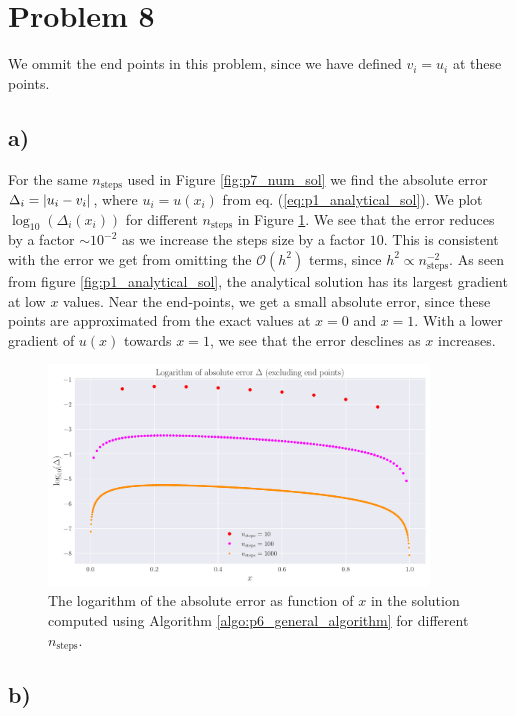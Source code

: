 \documentclass[english,notitlepage,nofootinbib]{revtex4-1}  %
\newcommand{\Fig}[1]{Figure \ref{fig:#1}}
\newcommand{\Eq}[1]{eq. (\ref{eq:#1})}
\newcommand{\Algo}[1]{Algorithm \ref{algo:#1}}
\begin{document}
\section*{Problem 8}

We ommit the end points in this problem, since we have defined $v_i=u_i$ at these points.

\subsection*{a)}

For the same $n_\text{steps}$ used in \Fig{p7_num_sol} we find the absolute error $\Delta_i = \abs{u_i-v_i}$, where $u_i=u(x_i)$ from \Eq{p1_analytical_sol}. We plot $\log_{10}(\Delta_i(x_i))$ for different $n_\text{steps}$ in \Fig{p8_abs_err}. We see that the error reduces by a factor $\sim 10^{-2}$ as we increase the steps size by a factor $10$. This is consistent with the error we get from omitting the $\mathcal{O}(h^2)$ terms, since $h^2 \propto n_\mathrm{steps}^{-2}$. As seen from figure \ref{fig:p1_analytical_sol}, the analytical solution has its largest gradient at low $x$ values. Near the end-points, we get a small absolute error, since these points are approximated from the exact values at $x=0$ and $x=1$. With a lower gradient of $u(x)$ towards $x=1$, we see that the error desclines as $x$ increases.  


\begin{figure}[h!]
    \centering
    \includegraphics[width=0.9\textwidth]{absolute_error.pdf}
    \caption{The logarithm of the absolute error as function of $x$ in the solution computed using \Algo{p6_general_algorithm} for different $n_\text{steps}$.}\label{fig:p8_abs_err}
\end{figure}

\subsection*{b)}
\end{document}
